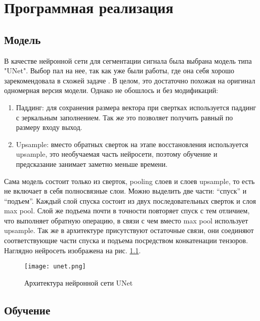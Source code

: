 \chapter{Программная реализация}

\section{Модель}

В качестве нейронной сети для сегментации сигнала была выбрана модель типа
"UNet". Выбор пал на нее, так как уже были работы, где она себя хорошо
зарекомендовала в схожей задаче \cite{victor}. В целом, это достаточно похожая
на оригинал одномерная версия модели. Однако не обошлось и без модификаций:

\begin{enumerate}

	\item Паддинг: для сохранения размера вектора при свертках используется
	      паддинг с зеркальным заполнением. Так же это позволяет получить равный по
	      размеру входу выход.

	\item Upsample: вместо обратных сверток на этапе восстановления
	      используется upsample, это необучаемая часть нейросети, поэтому обучение и
	      предсказание занимает заметно меньше времени.

\end{enumerate}

Сама модель состоит только из сверток, pooling слоев и слоев upsample, то есть
не включает в себя полносвязные слои. Можно выделить две части: ``спуск'' и
``подъем''. Каждый слой спуска состоит из двух последовательных сверток и слоя
max pool. Слой же подъема почти в точности повторяет спуск с тем отличием, что
выполняет обратную операцию, в связи с чем вместо max pool использует upsample.
Так же в архитектуре присутствуют остаточные связи, они соединяют
соответствующие части спуска и подъема посредством конкатенации тензоров.
Наглядно нейросеть изображена на рис. \ref{fig:unet}.

\begin{figure}[!htb]
	\centering
	\caption{Архитектура нейронной сети UNet}
	\texttt{[image: unet.png]}
	\label{fig:unet}
\end{figure}


\section{Обучение}

